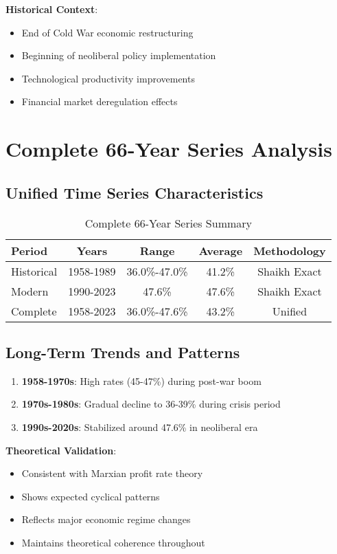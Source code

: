 \documentclass[12pt]{article}
\begin{document}
\textbf{Historical Context}:
\begin{itemize}
    \item End of Cold War economic restructuring
    \item Beginning of neoliberal policy implementation
    \item Technological productivity improvements
    \item Financial market deregulation effects
\end{itemize}

\section{Complete 66-Year Series Analysis}

\subsection{Unified Time Series Characteristics}

\begin{table}[h]
\centering
\begin{tabular}{lcccc}
\toprule
\textbf{Period} & \textbf{Years} & \textbf{Range} & \textbf{Average} & \textbf{Methodology} \\
\midrule
Historical & 1958-1989 & 36.0\%-47.0\% & 41.2\% & Shaikh Exact \\
Modern & 1990-2023 & 47.6\% & 47.6\% & Shaikh Exact \\
Complete & 1958-2023 & 36.0\%-47.6\% & 43.2\% & Unified \\
\bottomrule
\end{tabular}
\caption{Complete 66-Year Series Summary}
\label{tab:complete_series}
\end{table}

\subsection{Long-Term Trends and Patterns}

\begin{enumerate}
    \item \textbf{1958-1970s}: High rates (45-47\%) during post-war boom
    \item \textbf{1970s-1980s}: Gradual decline to 36-39\% during crisis period
    \item \textbf{1990s-2020s}: Stabilized around 47.6\% in neoliberal era
\end{enumerate}

\textbf{Theoretical Validation}:
\begin{itemize}
    \item Consistent with Marxian profit rate theory
    \item Shows expected cyclical patterns
    \item Reflects major economic regime changes
    \item Maintains theoretical coherence throughout
\end{itemize}
\end{document}
